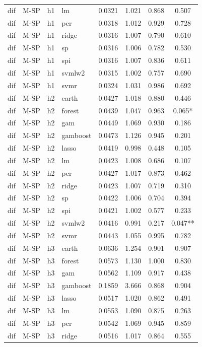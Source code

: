 \begin{ThreePartTable}
\begin{longtable}[t]{llclcccc}
dif & M-SP & h1 & lm & 0.0321 & 1.021 & 0.868 & 0.507\\
dif & M-SP & h1 & pcr & 0.0318 & 1.012 & 0.929 & 0.728\\
dif & M-SP & h1 & ridge & 0.0316 & 1.007 & 0.790 & 0.610\\
dif & M-SP & h1 & sp & 0.0316 & 1.006 & 0.782 & 0.530\\
dif & M-SP & h1 & spi & 0.0316 & 1.007 & 0.836 & 0.611\\
dif & M-SP & h1 & svmlw2 & 0.0315 & 1.002 & 0.757 & 0.690\\
dif & M-SP & h1 & svmr & 0.0324 & 1.031 & 0.986 & 0.692\\
\addlinespace
dif & M-SP & h2 & earth & 0.0427 & 1.018 & 0.880 & 0.446\\
dif & M-SP & h2 & forest & 0.0439 & 1.047 & 0.963 & 0.065*\\
dif & M-SP & h2 & gam & 0.0449 & 1.069 & 0.930 & 0.186\\
dif & M-SP & h2 & gamboost & 0.0473 & 1.126 & 0.945 & 0.201\\
dif & M-SP & h2 & lasso & 0.0419 & 0.998 & 0.448 & 0.105\\
dif & M-SP & h2 & lm & 0.0423 & 1.008 & 0.686 & 0.107\\
dif & M-SP & h2 & pcr & 0.0427 & 1.017 & 0.873 & 0.462\\
dif & M-SP & h2 & ridge & 0.0423 & 1.007 & 0.719 & 0.310\\
dif & M-SP & h2 & sp & 0.0422 & 1.006 & 0.704 & 0.394\\
dif & M-SP & h2 & spi & 0.0421 & 1.002 & 0.577 & 0.233\\
dif & M-SP & h2 & svmlw2 & 0.0416 & 0.991 & 0.217 & 0.047**\\
dif & M-SP & h2 & svmr & 0.0443 & 1.055 & 0.995 & 0.782\\
\addlinespace
dif & M-SP & h3 & earth & 0.0636 & 1.254 & 0.901 & 0.907\\
dif & M-SP & h3 & forest & 0.0573 & 1.130 & 1.000 & 0.830\\
dif & M-SP & h3 & gam & 0.0562 & 1.109 & 0.917 & 0.438\\
dif & M-SP & h3 & gamboost & 0.1859 & 3.666 & 0.868 & 0.904\\
dif & M-SP & h3 & lasso & 0.0517 & 1.020 & 0.862 & 0.491\\
dif & M-SP & h3 & lm & 0.0553 & 1.090 & 0.875 & 0.263\\
dif & M-SP & h3 & pcr & 0.0542 & 1.069 & 0.945 & 0.859\\
dif & M-SP & h3 & ridge & 0.0516 & 1.017 & 0.864 & 0.555\\

\end{longtable}
\end{ThreePartTable}
